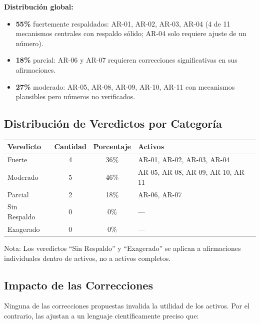 \documentclass[12pt,a4paper]{article}
\newcommand{\destacado}[1]{\textbf{#1}}
\begin{document}
\vspace{0.2cm}
\textbf{Distribución global:}
\begin{itemize}[itemsep=2pt]
    \item \destacado{55\%} fuertemente respaldados: AR-01, AR-02, AR-03, AR-04
          (4 de 11 mecanismos centrales con respaldo sólido; AR-04 solo requiere
          ajuste de un número).
    \item \destacado{18\%} parcial: AR-06 y AR-07 requieren correcciones
          significativas en sus afirmaciones.
    \item \destacado{27\%} moderado: AR-05, AR-08, AR-09, AR-10, AR-11 con
          mecanismos plausibles pero números no verificados.
\end{itemize}

\subsection{Distribución de Veredictos por Categoría}

\begin{tabularx}{\textwidth}{lccX}
\toprule
\textbf{Veredicto} & \textbf{Cantidad} & \textbf{Porcentaje} & \textbf{Activos} \\
\midrule
Fuerte & 4 & 36\% & AR-01, AR-02, AR-03, AR-04 \\
Moderado & 5 & 46\% & AR-05, AR-08, AR-09, AR-10, AR-11 \\
Parcial & 2 & 18\% & AR-06, AR-07 \\
Sin Respaldo & 0 & 0\% & — \\
Exagerado & 0 & 0\% & — \\
\bottomrule
\end{tabularx}

\vspace{0.2cm}
Nota: Los veredictos ``Sin Respaldo'' y ``Exagerado'' se aplican a afirmaciones
individuales dentro de activos, no a activos completos.

\subsection{Impacto de las Correcciones}

Ninguna de las correcciones propuestas invalida la utilidad de los activos.
Por el contrario, las ajustan a un lenguaje científicamente preciso que:
\end{document}

